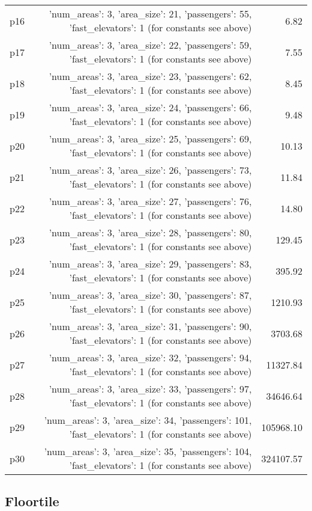 \documentclass{article}
\begin{document}
\begin{center}
\begin{tabular}{@{}l|r|r@{}}
  p16&{'num\_areas': 3, 'area\_size': 21, 'passengers': 55, 'fast\_elevators': 1 (for constants see above)}&6.82\\
  p17&{'num\_areas': 3, 'area\_size': 22, 'passengers': 59, 'fast\_elevators': 1 (for constants see above)}&7.55\\
  p18&{'num\_areas': 3, 'area\_size': 23, 'passengers': 62, 'fast\_elevators': 1 (for constants see above)}&8.45\\
  p19&{'num\_areas': 3, 'area\_size': 24, 'passengers': 66, 'fast\_elevators': 1 (for constants see above)}&9.48\\
  p20&{'num\_areas': 3, 'area\_size': 25, 'passengers': 69, 'fast\_elevators': 1 (for constants see above)}&10.13\\
  p21&{'num\_areas': 3, 'area\_size': 26, 'passengers': 73, 'fast\_elevators': 1 (for constants see above)}&11.84\\
  p22&{'num\_areas': 3, 'area\_size': 27, 'passengers': 76, 'fast\_elevators': 1 (for constants see above)}&14.80\\
  p23&{'num\_areas': 3, 'area\_size': 28, 'passengers': 80, 'fast\_elevators': 1 (for constants see above)}&129.45\\
  p24&{'num\_areas': 3, 'area\_size': 29, 'passengers': 83, 'fast\_elevators': 1 (for constants see above)}&395.92\\
  p25&{'num\_areas': 3, 'area\_size': 30, 'passengers': 87, 'fast\_elevators': 1 (for constants see above)}&1210.93\\
  p26&{'num\_areas': 3, 'area\_size': 31, 'passengers': 90, 'fast\_elevators': 1 (for constants see above)}&3703.68\\
  p27&{'num\_areas': 3, 'area\_size': 32, 'passengers': 94, 'fast\_elevators': 1 (for constants see above)}&11327.84\\
  p28&{'num\_areas': 3, 'area\_size': 33, 'passengers': 97, 'fast\_elevators': 1 (for constants see above)}&34646.64\\
  p29&{'num\_areas': 3, 'area\_size': 34, 'passengers': 101, 'fast\_elevators': 1 (for constants see above)}&105968.10\\
  p30&{'num\_areas': 3, 'area\_size': 35, 'passengers': 104, 'fast\_elevators': 1 (for constants see above)}&324107.57
                            \end{tabular}
                            \end{center}
                    
                            \newpage \subsection{Floortile}
\end{document}
